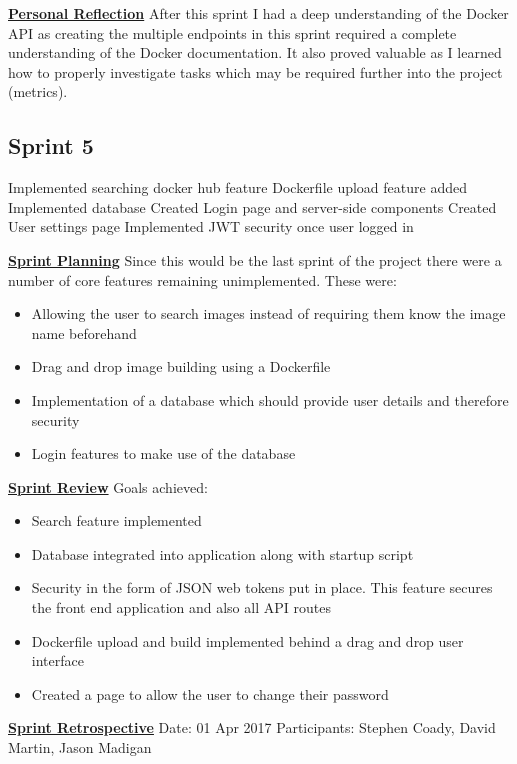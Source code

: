 \underline{\textbf{Personal Reflection}}\newline
After this sprint I had a deep understanding of the Docker API as creating the multiple endpoints in this sprint required a complete understanding of the Docker documentation. It also proved valuable as I learned how to properly investigate tasks which may be required further into the project (metrics).

\subsection{Sprint 5}
Implemented searching docker hub feature
Dockerfile upload feature added
Implemented database
Created Login page and server-side components
Created User settings page
Implemented JWT security once user logged in

\underline{\textbf{Sprint Planning}}\newline
Since this would be the last sprint of the project there were a number of core features remaining unimplemented. These were:
\begin{itemize}
	\item Allowing the user to search images instead of requiring them know the image name beforehand
	\item Drag and drop image building using a \gls{Dockerfile}
	\item Implementation of a database which should provide user details and therefore security
	\item Login features to make use of the database
\end{itemize}

\underline{\textbf{Sprint Review}}\newline
Goals achieved:
\begin{itemize}
	\item Search feature implemented
	\item Database integrated into application along with startup script
	\item Security in the form of JSON web tokens put in place. This feature secures the front end application and also all API routes
	\item Dockerfile upload and build implemented behind a drag and drop user interface
	\item Created a page to allow the user to change their password
\end{itemize}

\underline{\textbf{Sprint Retrospective}}\newline
Date: 01 Apr 2017
Participants: Stephen Coady, David Martin, Jason Madigan

